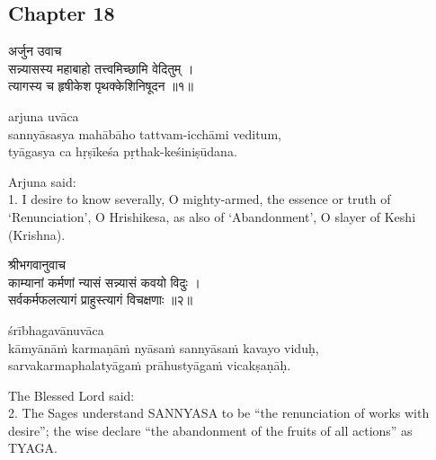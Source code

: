 \chapterdrop

\begin{center}

\headerspace
{}

\section{Chapter 18}

\headerspace
{}

\headerspace
{}

\headerspace
{}

\headerspace
\end{center}

\begin{gitaverse}
अर्जुन उवाच \\
सन्न्यासस्य महाबाहो तत्त्वमिच्छामि वेदितुम् । \\
त्यागस्य च हृषीकेश पृथक्केशिनिषूदन ॥१॥
\end{gitaverse}

\begin{transliteration}
arjuna uvāca \\
sannyāsasya mahābāho tattvam-icchāmi veditum, \\
tyāgasya ca hṛṣīkeśa pṛthak-keśiniṣūdana.
\end{transliteration}

Arjuna said: \\
1. I desire to know severally, O mighty-armed, the essence or truth of
`Renunciation', O Hrishikesa, as also of `Abandonment', O slayer of Keshi
(Krishna).

\begin{gitaverse}
श्रीभगवानुवाच \\
काम्यानां कर्मणां न्यासं सन्न्यासं कवयो विदुः । \\
सर्वकर्मफलत्यागं प्राहुस्त्यागं विचक्षणाः ॥२॥
\end{gitaverse}

\begin{transliteration}
śrībhagavānuvāca \\
kāmyānāṁ karmaṇāṁ nyāsaṁ sannyāsaṁ kavayo viduḥ, \\
sarvakarmaphalatyāgaṁ prāhustyāgaṁ vicakṣaṇāḥ.
\end{transliteration}

The Blessed Lord said: \\
2. The Sages understand SANNYASA to be ``the renunciation of works with
desire''; the wise declare ``the abandonment of the fruits of all actions'' as
TYAGA.\@

